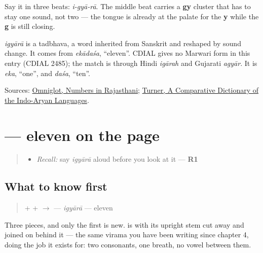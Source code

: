Say it in three beats: \emph{i-gyā-rā}. The middle beat carries a \textbf{gy} cluster that has to stay one sound, not two — the tongue is already at the palate for the \textbf{y} while the \textbf{g} is still closing.

\begin{cousinweb}
\emph{igyārā} is a tadbhava, a word inherited from Sanskrit and reshaped by sound change. It comes from \emph{ekādaśa}, \textquotedblleft{}eleven\textquotedblright{}. CDIAL gives no Marwari form in this entry (CDIAL 2485); the match is through Hindi \emph{igārah} and Gujarati \emph{agyār}. It is \emph{eka}, \textquotedblleft{}one\textquotedblright{}, and \emph{daśa}, \textquotedblleft{}ten\textquotedblright{}.
\end{cousinweb}

\begin{tcolorbox}[breakable,colback=teal!4,colframe=teal!35!black,title={Before you move on}]
Sources: \href{https://www.omniglot.com/language/numbers/rajasthani.htm}{Omniglot, Numbers in Rajasthani}; \href{https://dsal.uchicago.edu/dictionaries/soas/}{Turner, A Comparative Dictionary of the Indo-Aryan Languages}.
\end{tcolorbox}
\section[\texorpdfstring{\mw{इग्यारा} (igyārā)}{इग्यारा (igyārā)}]{ — eleven on the page}

\label{lesson:MW-C37-igyaara}



\begin{quote}
\begin{itemize}
\raggedright
  \item \emph{Recall:} say \emph{igyārā} aloud before you look at it — \textbf{R1}
\end{itemize}
\end{quote}

\subsection*{What to know first}
\begin{quote}
\textbf{} + \textbf{} + \textbf{} $\to$ \textbf{} — \emph{igyārā} — eleven
\end{quote}

Three pieces, and only the first is new. \textbf{} is \textbf{} with its upright stem cut away and \textbf{} joined on behind it — the same virama \textbf{} you have been writing since chapter 4, doing the job it exists for: two consonants, one breath, no vowel between them.

